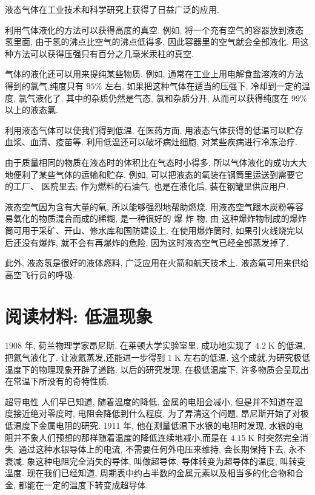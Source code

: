 \documentclass[10pt]{article}
\begin{document}
液态气体在工业技术和科学研究上获得了日益广泛的应用.

利用气体液化的方法可以获得高度的真空. 例如, 将一个充有空气的容器放到液态氢里面, 由于氢的沸点比空气的沸点低得多, 因此容器里的空气就会全部液化. 用这种方法可以获得压强只有百分之几毫米汞柱的真空.

气体的液化还可以用来提纯某些物质. 例如, 通常在工业上用电解食盐溶液的方法得到的氯气,纯度只有 \({95}\%\) 左右, 如果把这种气体在适当的压强下, 冷却到一定的温度, 氯气液化了, 其中的杂质仍然是气态, 氯和杂质分开, 从而可以获得纯度在 \({99}\%\) 以上的液态氯.

利用液态气体可以使我们得到低温. 在医药方面, 用液态气体获得的低温可以贮存血浆、血清、疫苗等. 利用低温还可以破坏病灶细胞, 对某些疾病进行冷冻治疗.

由于质量相同的物质在液态时的体积比在气态时小得多, 所以气体液化的成功大大地便利了某些气体的运输和贮存. 例如, 可以把液态的氧装在钢筒里运送到需要它的工厂、 医院里去; 作为燃料的石油气, 也是在液化后, 装在钢罐里供应用户.

液态空气因为含有大量的氧, 所以能够强烈地帮助燃烧. 用液态空气跟木炭粉等容易氧化的物质混合而成的稀糊, 是一种很好的 爆 炸 物, 由 这种爆炸物制成的爆炸筒可用于采矿、开山、修水库和国防建设上. 在使用爆炸筒时, 如果引火线烧完以后还没有爆炸, 就不会有再爆炸的危险, 因为这时液态空气已经全部蒸发掉了.

此外, 液态氢是很好的液体燃料, 广泛应用在火箭和航天技术上. 液态氧可用来供给高空飞行员的呼吸.

\section*{阅读材料: 低温现象}

1908 年, 荷兰物理学家昂尼斯, 在莱顿大学实验室里, 成功地实现了 \({4.2}\mathrm{\;K}\) 的低温,把氦气液化了. 让液氦蒸发,还能进一步得到 \(1\mathrm{\;K}\) 左右的低温. 这个成就,为研究极低温度下的物理现象开辟了道路. 以后的研究发现, 在极低温度下, 许多物质会呈现出在常温下所没有的奇特性质.

超导电性 人们早已知道, 随着温度的降低, 金属的电阻会减小, 但是并不知道在温度接近绝对零度时, 电阻会降低到什么程度. 为了弄清这个问题, 昂尼斯开始了对极低温度下金属电阻的研究. 1911 年, 他在测量低温下水银的电阻时发现, 水银的电阻并不象人们预想的那样随着温度的降低连续地减小,而是在 \({4.15}\mathrm{\;K}\) 时突然完全消失. 通过这种水银导体上的电流, 不需要任何外电压来维持, 会长期保持下去, 永不衰减. 象这种电阻完全消失的导体, 叫做超导体. 导体转变为超导体的温度, 叫转变温度. 现在我们已经知道, 周期表中约占半数的金属元素以及相当多的化合物和合金, 都能在一定的温度下转变成超导体.
\end{document}
